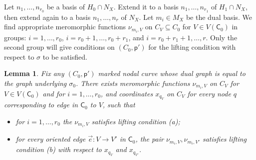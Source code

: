 \documentclass{article}
\newtheorem{lemma}[definition]{Lemma}
\newcommand{\tropC}{\mathsf{C}}
\begin{document}
Let $n_1, \ldots, n_{r_0}$ be a basis of $H_0\cap N_X$. Extend it to a basis $n_1, \ldots, n_{r_1}$ of $H_1 \cap N_X$, then extend again to a basis $n_1, \ldots, n_r$ of $N_X$. Let $m_i \in M_X$ be the dual basis. We find appropriate meromorphic functions $\nu_{m_i, V}$ on $C_V \subseteq C_0$ for $V \in V(\tropC_0)$ in groups: $i = 1, \ldots, r_0$, $i = r_0+1, \ldots, r_0+r_1$, and $i = r_0+r_1 +1, \ldots, r$. Only the second group will give conditions on $(C_0, \mathsf{p}')$ for the lifting condition with respect to $\sigma$ to be satisfied. 

\begin{lemma} \label{lem: lift in cycle}
    Fix any $(C_0, \mathsf{p}')$ marked nodal curve whose dual graph is equal to the graph underlying $\sigma_0$. There exists meromorphic functions $\nu_{m_i, V}$ on $C_V$ for $V \in V(\tropC_0)$ and for $i = 1, \ldots, {r_0}$, and coordinates $x_{q_V}$ on $C_V$ for every node $q$ corresponding to edge in $\tropC_0$ to $V$, such that \begin{itemize}
        \item for $i = 1, \ldots, {r_0}$ the $\nu_{m_i,V}$ satisfies lifting condition (a);
        \item for every oriented edge $\vec{e}\colon V \to V'$ in $\tropC_0$, the pair $\nu_{m_i, V}, \nu_{m_i, V'}$ satisfies lifting condition (b) with respect to $x_{q_V}$ and $x_{q_{V'}}$.
    \end{itemize}
    
\end{lemma}
\end{document}
